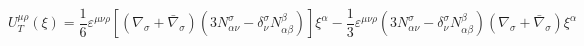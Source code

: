 \begin{equation}
U_T^{\mu \rho }(\xi )=
\frac{1}{6}\varepsilon^{\mu\nu\rho}[(\nabla
_{\sigma}+\bar{\nabla}_{\sigma})(3N_{\alpha\nu}^{\sigma}
- \delta_{\nu}^{\sigma}N_{\alpha\beta}^{\beta})]\xi^{\alpha} %
- \frac{1}{3}\varepsilon^{\mu\nu\rho}(3N_{\alpha\nu}^{\sigma}
-\delta_{\nu}^{\sigma}N_{\alpha\beta}^{\beta})(\nabla_{\sigma}+
\bar{\nabla}_{\sigma })\xi ^{\alpha }\label{eqn:UT20}
\end{equation}

